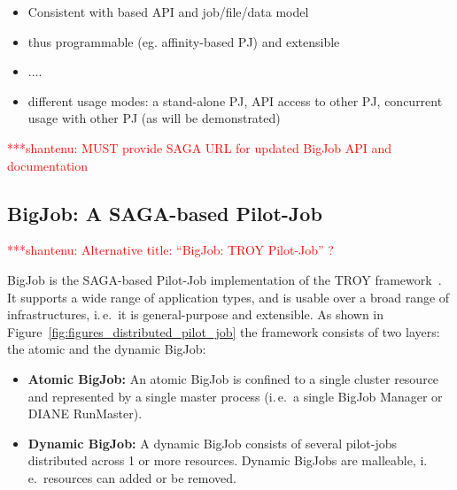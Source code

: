 \documentclass[conference,final]{IEEEtran}
\newcommand{\jhanote}[1]{ {\textcolor{red} { ***shantenu: #1 }}}
\newcommand{\jhanote}[1]{}
\begin{document}
\begin{itemize}
\item Consistent with based API and job/file/data model
\item thus programmable (eg. affinity-based PJ) and extensible 
\item ....
\item different usage modes: a stand-alone PJ, API access to other PJ,
  concurrent usage with other PJ (as will be demonstrated)
\end{itemize}

\jhanote{MUST provide SAGA URL for updated BigJob API and
  documentation}\cite{troy_api}

\subsection{BigJob: A SAGA-based Pilot-Job}

\jhanote{Alternative title: ``BigJob: TROY Pilot-Job'' ?}


BigJob is the SAGA-based Pilot-Job implementation of the TROY
framework~\cite{bigjob_web}. 
It supports a wide range of application types, and is
usable over a broad range of infrastructures, i.\,e.\ it is
general-purpose and extensible.  As shown in Figure~\ref{fig:figures_distributed_pilot_job} the framework consists of two layers: the atomic and the dynamic BigJob:
\begin{itemize}
   \item  \textbf{Atomic BigJob:} An atomic BigJob is confined to a single 
   cluster resource and represented by a single master process (i.\,e.\ a 
   single BigJob Manager or DIANE RunMaster).
	\item \textbf{Dynamic BigJob:} A dynamic BigJob consists of several 
	pilot-jobs distributed across 1 or more resources. Dynamic BigJobs are 
	malleable, i.\,e.\ resources can added or be removed.
\end{itemize}
\end{document}

